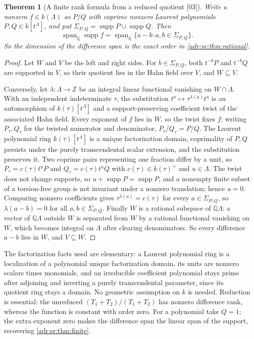 \documentclass[11pt,letterpaper]{article}
\numberwithin{equation}{section}
\newtheorem{theorem}{Theorem}[section]
\theoremstyle{definition}
\theoremstyle{remark}
\newcommand{\Q}{\mathbb Q}
\newcommand{\Z}{\mathbb Z}
\newcommand{\supp}{\operatorname{supp}}
\newcommand{\src}[1]{\textup{[#1]}}%
\begin{document}
\begin{theorem}[A finite rank formula from a reduced quotient \src{03}]
\label{adr:sr:thm:quotient}
Write a nonzero $f\in k(\Lambda)$ as $P/Q$ with coprime nonzero Laurent
polynomials $P,Q\in k[t^\Lambda]$, and put $\Sigma_{P,Q}=\supp P\cup\supp Q$.
Then
\begin{equation}\label{adr:sr:eq:quotient}
 \operatorname{span}_\Q\supp f=\operatorname{span}_\Q\{a-b:a,b\in\Sigma_{P,Q}\}.
\end{equation}
So the dimension of the difference span is the exact order in
\cref{adr:sr:thm:rational}.
\end{theorem}
\begin{proof}
Let $W$ and $V$ be the left and right sides. For $b\in\Sigma_{P,Q}$, both
$t^{-b}P$ and $t^{-b}Q$ are supported in $V$, so their quotient lies in the
Hahn field over $V$, and $W\subseteq V$.

Conversely, let $\lambda:\Lambda\to\Z$ be an integral linear functional
vanishing on $W\cap\Lambda$. With an independent indeterminate $\tau$, the
substitution $t^a\mapsto\tau^{\lambda(a)}t^a$ is an automorphism of
$k(\tau)[t^\Lambda]$ and a support-preserving coefficient twist of the
associated Hahn field. Every exponent of $f$ lies in $W$, so the twist fixes
$f$; writing $P_\tau,Q_\tau$ for the twisted numerator and denominator,
$P_\tau/Q_\tau=P/Q$. The Laurent polynomial ring $k(\tau)[t^\Lambda]$ is a
unique factorization domain, coprimality of $P,Q$ persists under the purely
transcendental scalar extension, and the substitution preserves it. Two
coprime pairs representing one fraction differ by a unit, so
$P_\tau=c(\tau)t^uP$ and $Q_\tau=c(\tau)t^uQ$ with $c(\tau)\in k(\tau)^\times$
and $u\in\Lambda$. The twist does not change supports, so
$u+\supp P=\supp P$, and a nonempty finite subset of a torsion-free group is
not invariant under a nonzero translation; hence $u=0$. Comparing nonzero
coefficients gives $\tau^{\lambda(a)}=c(\tau)$ for every $a\in\Sigma_{P,Q}$, so
$\lambda(a-b)=0$ for all $a,b\in\Sigma_{P,Q}$. Finally $W$ is a rational
subspace of $\Q\Lambda$: a vector of $\Q\Lambda$ outside $W$ is separated from
$W$ by a rational functional vanishing on $W$, which becomes integral on
$\Lambda$ after clearing denominators. So every difference $a-b$ lies in $W$,
and $V\subseteq W$.
\end{proof}

The factorization facts used are elementary: a Laurent polynomial ring is a
localization of a polynomial unique factorization domain, its units are
nonzero scalars times monomials, and an irreducible coefficient polynomial
stays prime after adjoining and inverting a purely transcendental parameter,
since its quotient ring stays a domain. No geometric assumption on $k$ is
needed. Reduction is essential: the unreduced $(T_1+T_2)/(T_1+T_2)$ has
nonzero difference rank, whereas the function is constant with order zero.
For a polynomial take $Q=1$; the extra exponent zero makes the difference span
the linear span of the support, recovering \cref{adr:sr:thm:finite}.
\end{document}
